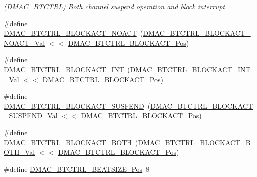 \begin{DoxyCompactItemize}
\begin{DoxyCompactList}\small\item\em (D\+M\+A\+C\+\_\+\+B\+T\+C\+T\+RL) Both channel suspend operation and block interrupt \end{DoxyCompactList}\item 
\#define \mbox{\hyperlink{group___s_a_m_d21___d_m_a_c_ga95d86bc048e58482a8196a1b0c2785c6}{D\+M\+A\+C\+\_\+\+B\+T\+C\+T\+R\+L\+\_\+\+B\+L\+O\+C\+K\+A\+C\+T\+\_\+\+N\+O\+A\+CT}}~(\mbox{\hyperlink{group___s_a_m_d21___d_m_a_c_gae3898b14fd517579b8b018b2ba176c4d}{D\+M\+A\+C\+\_\+\+B\+T\+C\+T\+R\+L\+\_\+\+B\+L\+O\+C\+K\+A\+C\+T\+\_\+\+N\+O\+A\+C\+T\+\_\+\+Val}} $<$$<$ \mbox{\hyperlink{group___s_a_m_d21___d_m_a_c_ga65ebce978928207ff9f7ae48e8a1c602}{D\+M\+A\+C\+\_\+\+B\+T\+C\+T\+R\+L\+\_\+\+B\+L\+O\+C\+K\+A\+C\+T\+\_\+\+Pos}})
\item 
\#define \mbox{\hyperlink{group___s_a_m_d21___d_m_a_c_gaaba7920eeccf5ffffb8eb5c977fcde63}{D\+M\+A\+C\+\_\+\+B\+T\+C\+T\+R\+L\+\_\+\+B\+L\+O\+C\+K\+A\+C\+T\+\_\+\+I\+NT}}~(\mbox{\hyperlink{group___s_a_m_d21___d_m_a_c_ga8605dcd06a16a3950e7181cd5a231bfc}{D\+M\+A\+C\+\_\+\+B\+T\+C\+T\+R\+L\+\_\+\+B\+L\+O\+C\+K\+A\+C\+T\+\_\+\+I\+N\+T\+\_\+\+Val}}  $<$$<$ \mbox{\hyperlink{group___s_a_m_d21___d_m_a_c_ga65ebce978928207ff9f7ae48e8a1c602}{D\+M\+A\+C\+\_\+\+B\+T\+C\+T\+R\+L\+\_\+\+B\+L\+O\+C\+K\+A\+C\+T\+\_\+\+Pos}})
\item 
\#define \mbox{\hyperlink{group___s_a_m_d21___d_m_a_c_ga74b668d6b216e19fa82f4993f7ab4b3a}{D\+M\+A\+C\+\_\+\+B\+T\+C\+T\+R\+L\+\_\+\+B\+L\+O\+C\+K\+A\+C\+T\+\_\+\+S\+U\+S\+P\+E\+ND}}~(\mbox{\hyperlink{group___s_a_m_d21___d_m_a_c_ga6a02db6a41d6c6df8b95fae49b817100}{D\+M\+A\+C\+\_\+\+B\+T\+C\+T\+R\+L\+\_\+\+B\+L\+O\+C\+K\+A\+C\+T\+\_\+\+S\+U\+S\+P\+E\+N\+D\+\_\+\+Val}} $<$$<$ \mbox{\hyperlink{group___s_a_m_d21___d_m_a_c_ga65ebce978928207ff9f7ae48e8a1c602}{D\+M\+A\+C\+\_\+\+B\+T\+C\+T\+R\+L\+\_\+\+B\+L\+O\+C\+K\+A\+C\+T\+\_\+\+Pos}})
\item 
\#define \mbox{\hyperlink{group___s_a_m_d21___d_m_a_c_ga89f76bbd6bc0047c6581e438d93aa1fe}{D\+M\+A\+C\+\_\+\+B\+T\+C\+T\+R\+L\+\_\+\+B\+L\+O\+C\+K\+A\+C\+T\+\_\+\+B\+O\+TH}}~(\mbox{\hyperlink{group___s_a_m_d21___d_m_a_c_gaff1916c577aec155dc2978b341daace2}{D\+M\+A\+C\+\_\+\+B\+T\+C\+T\+R\+L\+\_\+\+B\+L\+O\+C\+K\+A\+C\+T\+\_\+\+B\+O\+T\+H\+\_\+\+Val}} $<$$<$ \mbox{\hyperlink{group___s_a_m_d21___d_m_a_c_ga65ebce978928207ff9f7ae48e8a1c602}{D\+M\+A\+C\+\_\+\+B\+T\+C\+T\+R\+L\+\_\+\+B\+L\+O\+C\+K\+A\+C\+T\+\_\+\+Pos}})
\item 
\#define \mbox{\hyperlink{group___s_a_m_d21___d_m_a_c_ga4961493aedfe85b741e91f8370b9586c}{D\+M\+A\+C\+\_\+\+B\+T\+C\+T\+R\+L\+\_\+\+B\+E\+A\+T\+S\+I\+Z\+E\+\_\+\+Pos}}~8

\end{DoxyCompactItemize}
